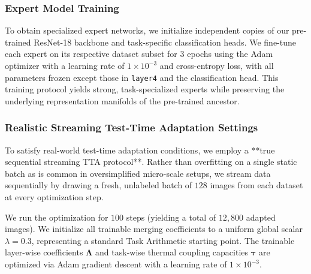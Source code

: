 \subsubsection{Expert Model Training}
To obtain specialized expert networks, we initialize independent copies of our pre-trained ResNet-18 backbone and task-specific classification heads. We fine-tune each expert on its respective dataset subset for $3$ epochs using the Adam optimizer with a learning rate of $1\times10^{-3}$ and cross-entropy loss, with all parameters frozen except those in \texttt{layer4} and the classification head. This training protocol yields strong, task-specialized experts while preserving the underlying representation manifolds of the pre-trained ancestor.

\subsubsection{Realistic Streaming Test-Time Adaptation Settings}
To satisfy real-world test-time adaptation conditions, we employ a **true sequential streaming TTA protocol**. Rather than overfitting on a single static batch as is common in oversimplified micro-scale setups, we stream data sequentially by drawing a fresh, unlabeled batch of $128$ images from each dataset at every optimization step. 

We run the optimization for $100$ steps (yielding a total of $12,800$ adapted images). We initialize all trainable merging coefficients to a uniform global scalar $\lambda = 0.3$, representing a standard Task Arithmetic starting point. The trainable layer-wise coefficients $\boldsymbol{\Lambda}$ and task-wise thermal coupling capacities $\boldsymbol{\tau}$ are optimized via Adam gradient descent with a learning rate of $1\times10^{-3}$.

